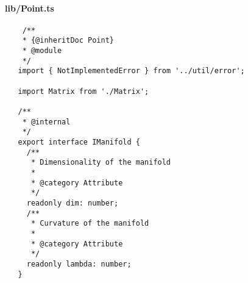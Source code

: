 \documentclass[../main.tex]{subfiles}
\begin{document}
\paragraph{lib/Point.ts}
\begin{verbatim}
    /**
    * {@inheritDoc Point}
    * @module
    */
   import { NotImplementedError } from '../util/error';
   
   import Matrix from './Matrix';
   
   /**
    * @internal
    */
   export interface IManifold {
     /**
      * Dimensionality of the manifold
      *
      * @category Attribute
      */
     readonly dim: number;
     /**
      * Curvature of the manifold
      *
      * @category Attribute
      */
     readonly lambda: number;
   }
   

\end{verbatim}
\end{document}
